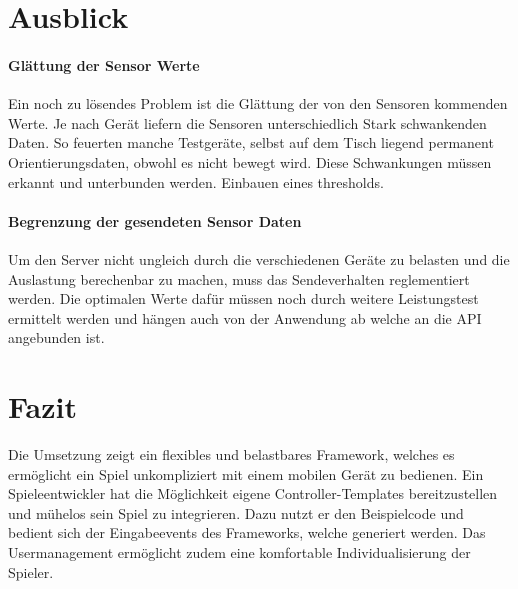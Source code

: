 \documentclass[a4paper]{spie}  %
\begin{document}
\section{Ausblick}

\paragraph{Glättung der Sensor Werte}
Ein noch zu lösendes Problem ist die Glättung der von den Sensoren kommenden Werte. Je nach Gerät liefern die Sensoren unterschiedlich Stark schwankenden Daten. So feuerten manche Testgeräte, selbst auf dem Tisch liegend permanent Orientierungsdaten, obwohl es nicht bewegt wird. Diese Schwankungen müssen erkannt und unterbunden werden. Einbauen eines thresholds.

\paragraph{Begrenzung der gesendeten Sensor Daten}
Um den Server nicht ungleich durch die verschiedenen Geräte zu belasten und die Auslastung berechenbar zu machen, muss das Sendeverhalten reglementiert werden. Die optimalen Werte dafür müssen noch durch weitere Leistungstest ermittelt werden und hängen auch von der Anwendung ab welche an die API angebunden ist.


\section{Fazit}
Die Umsetzung zeigt ein flexibles und belastbares Framework, welches es ermöglicht ein Spiel unkompliziert mit einem mobilen Gerät zu bedienen.
Ein Spieleentwickler hat die Möglichkeit eigene Controller-Templates bereitzustellen und mühelos sein Spiel zu integrieren.
Dazu nutzt er den Beispielcode und bedient sich der Eingabeevents des Frameworks, welche generiert werden. Das Usermanagement ermöglicht zudem eine komfortable Individualisierung der Spieler.





\end{document}
